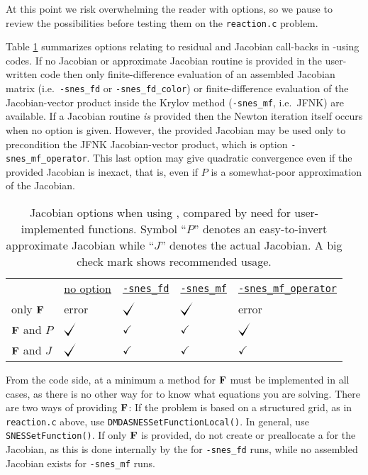 At this point we risk overwhelming the reader with options, so we pause to review the possibilities before testing them on the \texttt{reaction.c} problem.

Table \ref{tab:snesjacobianoptions:needed} summarizes options relating to residual and Jacobian call-backs in \pSNES-using codes.  If no Jacobian or approximate Jacobian routine is provided in the user-written code then only finite-difference evaluation of an assembled Jacobian matrix (i.e.~\texttt{-snes\_fd} or \texttt{-snes\_fd\_color}) or finite-difference evaluation of the Jacobian-vector product inside the Krylov method (\texttt{-snes\_mf}, i.e.~JFNK) are available.  If a Jacobian routine \emph{is} provided then the Newton iteration itself occurs when no option is given.  However, the provided Jacobian may be used only to precondition the JFNK Jacobian-vector product, which is option \texttt{-snes\_mf\_operator}.  This last option may give quadratic convergence even if the provided Jacobian is inexact, that is, even if $P$ is a somewhat-poor approximation of the Jacobian.

\begin{table}
\begin{tabular}{lllll}
 &\underline{no option}\hspace{0.0in} & \underline{\texttt{-snes\_fd}} & \underline{\texttt{-snes\_mf}} & \underline{\texttt{-snes\_mf\_operator}} \\
only $\mathbf{F}$      & error           & $\bigcheckmark$ & $\bigcheckmark$ & error \\
$\mathbf{F}$ and $P$   & $\bigcheckmark$ & $\checkmark$    & $\checkmark$    & $\bigcheckmark$ \\
$\mathbf{F}$ and $J$   & $\bigcheckmark$ & $\checkmark$    & $\checkmark$    & $\checkmark$
\end{tabular}
\caption{Jacobian options when using \pSNES, compared by need for user-implemented functions.  Symbol ``$P$'' denotes an easy-to-invert approximate Jacobian while ``$J$'' denotes the actual Jacobian.  A big check mark shows recommended usage.} \label{tab:snesjacobianoptions:needed}
\end{table}

From the code side, at a minimum a method for $\mathbf{F}$ must be implemented in all cases, as there is no other way for \PETSc to know what equations you are solving.  There are two ways of providing $\mathbf{F}$:  If the problem is based on a structured grid, as in \texttt{reaction.c} above, use \texttt{DMDASNESSetFunctionLocal()}.  In general, use \texttt{SNESSetFunction()}.  If only $\mathbf{F}$ is provided, do not create or preallocate a \pMat for the Jacobian, as this is done internally by the \pSNES for \texttt{-snes\_fd} runs, while no assembled Jacobian \pMat exists for \texttt{-snes\_mf} runs.

